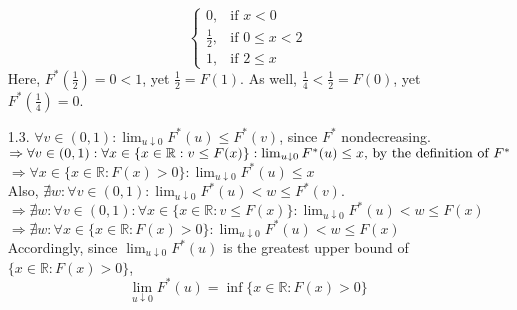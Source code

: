 \documentclass[11pt]{article}
\newcommand{\R}{\mathbb{R}}
\theoremstyle{definition}
\begin{document}
\begin{itemize}
\[            \begin{cases} 
                0,           &\mbox{if } x<0          \\
                \frac{1}{2}, &\mbox{if } 0\leq x < 2  \\
                1,           &\mbox{if } 2\leq x
            \end{cases}
        \]
        Here, $F^*(\frac{1}{2})=0<1$, yet $\frac{1}{2}=F(1)$. As well, $\frac{1}{4}<\frac{1}{2}=F(0)$, yet $F^*(\frac{1}{4})=0$.
    \item[1.3.]
        \(\forall v\in (0,1): \lim_{u\downarrow 0} F^*(u) \leq F^*(v)\), since $F^*$ nondecreasing. \\
        \(\Rightarrow \forall v\in (0,1): \forall x \in \{x\in\R: v\leq F(x)\}: \lim_{u\downarrow 0} F^*(u) \leq x$, by the definition of $F^*\) \\
        \(\Rightarrow \forall x \in \{x\in \R: F(x)>0\}: \lim_{u\downarrow 0} F^*(u) \leq x\) \\
        Also, \(\nexists w: \forall v\in (0,1): \lim_{u\downarrow 0} F^*(u) < w \leq F^*(v)\). \\
        \(\Rightarrow \nexists w: \forall v\in (0,1): \forall x \in \{x\in \R: v\leq F(x)\}: \lim_{u\downarrow 0} F^*(u) < w \leq F(x) \) \\
        \(\Rightarrow \nexists w: \forall x \in \{x\in \R: F(x)>0\}: \lim_{u\downarrow 0} F^*(u) < w \leq F(x) \) \\
        Accordingly, since \(\lim_{u\downarrow 0} F^*(u)\) is the greatest upper bound of \(\{x\in \R: F(x)>0\}\), \\
        \[\lim_{u\downarrow 0} F^*(u) = \inf\{x\in \R: F(x)>0\}\]
        \smallskip


\end{itemize}
\end{document}
